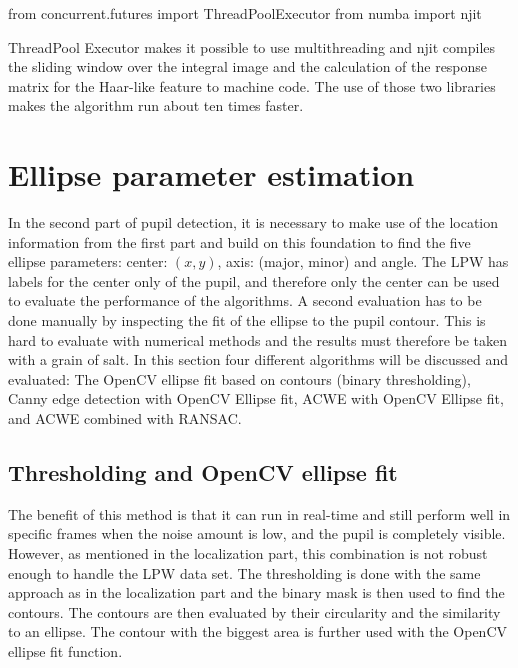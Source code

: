 \begin{python}
from concurrent.futures import ThreadPoolExecutor
from numba import njit
    \end{python}

ThreadPool Executor makes it possible to use multithreading and njit compiles the sliding window over the integral image and the calculation of the response matrix for the Haar-like feature to machine code. The use of those two libraries makes the algorithm run about ten times faster. 

\section{Ellipse parameter estimation}
In the second part of pupil detection, it is necessary to make use of the location information from the first part and build on this foundation to find the five ellipse parameters: center: $(x,y)$, axis: (major, minor) and angle. The LPW has labels for the center only of the pupil, and therefore only the center can be used to evaluate the performance of the algorithms. A second evaluation has to be done manually by inspecting the fit of the ellipse to the pupil contour. This is hard to evaluate with numerical methods and the results must therefore be taken with a grain of salt. In this section four different algorithms will be discussed and evaluated: The OpenCV ellipse fit based on contours (binary thresholding), Canny edge detection with OpenCV Ellipse fit,  ACWE with OpenCV Ellipse fit, and ACWE combined with RANSAC.

\subsection{Thresholding and OpenCV ellipse fit}
\label{sus:thresholding_ellipse_fit}
The benefit of this method is that it can run in real-time and still perform well in specific frames when the noise amount is low, and the pupil is completely visible. However, as mentioned in the localization part, this combination is not robust enough to handle the LPW data set. The thresholding is done with the same approach as in the localization part and the binary mask is then used to find the contours. The contours are then evaluated by their circularity and the similarity to an ellipse. The contour with the biggest area is further used with the OpenCV ellipse fit function. 

